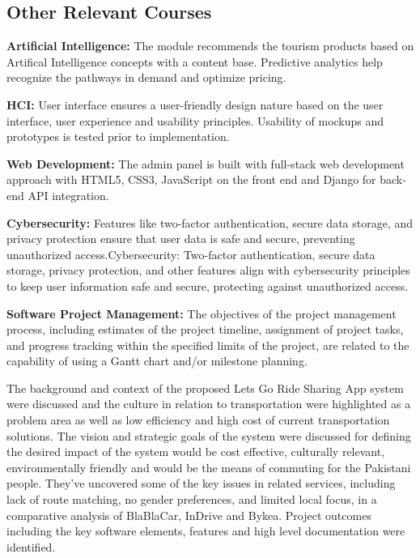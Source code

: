 \subsection{Other Relevant Courses}

\textbf{Artificial Intelligence:} The module recommends the tourism products based on Artifical Intelligence concepts with a content base. Predictive analytics help recognize the pathways in demand and optimize pricing.

\textbf{HCI:} User interface ensures a user-friendly design nature based on the user interface, user experience and usability principles. Usability of mockups and prototypes is tested prior to implementation.

\textbf{Web Development:} The admin panel is built with full-stack web development approach with HTML5, CSS3, JavaScript on the front end and Django for back-end API integration.

\textbf{Cybersecurity:} Features like two-factor authentication, secure data storage, and privacy protection ensure that user data is safe and secure, preventing unauthorized access.Cybersecurity: Two-factor authentication, secure data storage, privacy protection, and other features align with cybersecurity principles to keep user information safe and secure, protecting against unauthorized access.

\textbf{Software Project Management:} The objectives of the project management process, including estimates of the project timeline, assignment of project tasks, and progress tracking within the specified limits of the project, are related to the capability of using a Gantt chart and/or milestone planning.

The background and context of the proposed Lets Go Ride Sharing App system were discussed and the culture in relation to transportation were highlighted as a problem area as well as low efficiency and high cost of current transportation solutions. The vision and strategic goals of the system were discussed for defining the desired impact of the system would be cost effective, culturally relevant, environmentally friendly and would be the means of commuting for the Pakistani people. They've uncovered some of the key issues in related services, including lack of route matching, no gender preferences, and limited local focus, in a comparative analysis of BlaBlaCar, InDrive and Bykea. Project outcomes including the key software elements, features and high level documentation were identified.
